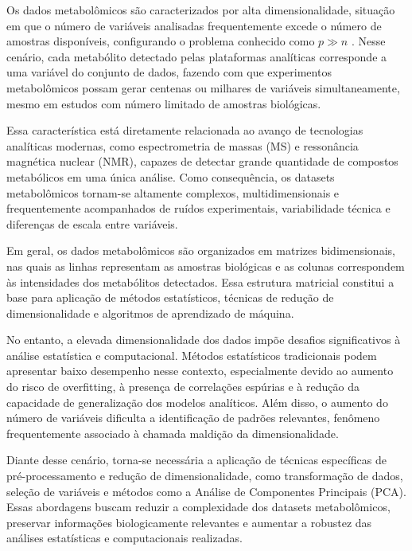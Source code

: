 Os dados metabolômicos são caracterizados por alta dimensionalidade, situação em que o número de variáveis analisadas frequentemente excede o número de amostras disponíveis, configurando o problema conhecido como $p \gg n$ \cite{gunawan2022data} . Nesse cenário, cada metabólito detectado pelas plataformas analíticas corresponde a uma variável do conjunto de dados, fazendo com que experimentos metabolômicos possam gerar centenas ou milhares de variáveis simultaneamente, mesmo em estudos com número limitado de amostras biológicas.

Essa característica está diretamente relacionada ao avanço de tecnologias analíticas modernas, como espectrometria de massas (MS) e ressonância magnética nuclear (NMR), capazes de detectar grande quantidade de compostos metabólicos em uma única análise\cite{NMR}. Como consequência, os datasets metabolômicos tornam-se altamente complexos, multidimensionais e frequentemente acompanhados de ruídos experimentais, variabilidade técnica e diferenças de escala entre variáveis.

Em geral, os dados metabolômicos são organizados em matrizes bidimensionais, nas quais as linhas representam as amostras biológicas e as colunas correspondem às intensidades dos metabólitos detectados. Essa estrutura matricial constitui a base para aplicação de métodos estatísticos, técnicas de redução de dimensionalidade e algoritmos de aprendizado de máquina\cite{gunawan2022data}.

No entanto, a elevada dimensionalidade dos dados impõe desafios significativos à análise estatística e computacional.\cite{shahjaman2021rmisbeta} Métodos estatísticos tradicionais podem apresentar baixo desempenho nesse contexto, especialmente devido ao aumento do risco de overfitting, à presença de correlações espúrias e à redução da capacidade de generalização dos modelos analíticos. Além disso, o aumento do número de variáveis dificulta a identificação de padrões relevantes, fenômeno frequentemente associado à chamada maldição da dimensionalidade\cite{gunawan2022data}.

Diante desse cenário, torna-se necessária a aplicação de técnicas específicas de pré-processamento e redução de dimensionalidade, como transformação de dados, seleção de variáveis e métodos como a Análise de Componentes Principais (PCA). Essas abordagens buscam reduzir a complexidade dos datasets metabolômicos, preservar informações biologicamente relevantes e aumentar a robustez das análises estatísticas e computacionais realizadas.

